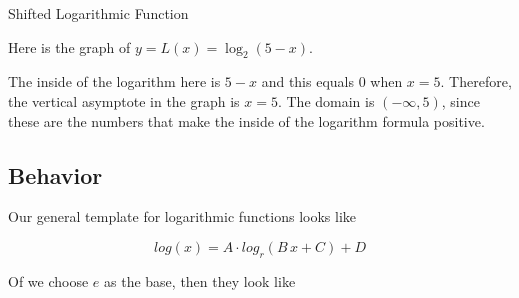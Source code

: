 \documentclass{ximera}
\begin{document}
\begin{example} Shifted Logarithmic Function



Here is the graph of $y = L(x) = \log_2(5-x)$.

\begin{image}
\end{image}




The inside of the logarithm here is $5-x$ and this equals $0$ when $x=5$.  Therefore, the vertical asymptote in the graph is $x=5$.  The domain is $(-\infty, 5)$, since these are the numbers that make the inside of the logarithm formula positive.





\end{example}











\subsection*{Behavior}







Our general template for logarithmic functions looks like

\[
log(x) = A \cdot log_r(B \, x + C) + D
\]

Of we choose $e$ as the base, then they look like
\end{document}
